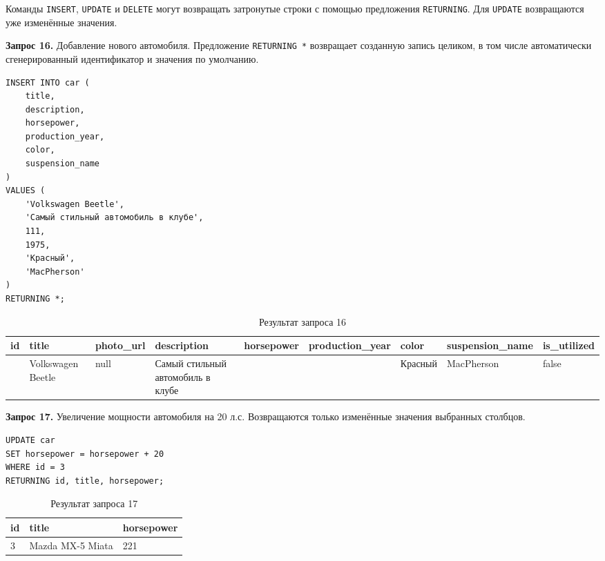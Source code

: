 \documentclass[oneside,a4paper,14pt]{extarticle}
\begin{document}
Команды \texttt{INSERT}, \texttt{UPDATE} и \texttt{DELETE} могут возвращать затронутые строки с помощью предложения \texttt{RETURNING}. Для \texttt{UPDATE} возвращаются уже изменённые значения.

\textbf{Запрос 16.} Добавление нового автомобиля. Предложение \texttt{RETURNING *} возвращает созданную запись целиком, в том числе автоматически сгенерированный идентификатор и значения по умолчанию.

\begin{verbatim}
INSERT INTO car (
    title,
    description,
    horsepower,
    production_year,
    color,
    suspension_name
)
VALUES (
    'Volkswagen Beetle',
    'Самый стильный автомобиль в клубе',
    111,
    1975,
    'Красный',
    'MacPherson'
)
RETURNING *;
\end{verbatim}

\begin{table}[H]
\centering
\scriptsize
\setlength{\tabcolsep}{2pt}
\caption{Результат запроса 16}\label{tab:ret1}
\begin{tabular}{|>{\raggedright\arraybackslash}p{5mm}|>{\raggedright\arraybackslash}p{16mm}|>{\raggedright\arraybackslash}p{21mm}|>{\raggedright\arraybackslash}p{26mm}|>{\raggedright\arraybackslash}p{19mm}|>{\raggedright\arraybackslash}p{19mm}|>{\raggedright\arraybackslash}p{16mm}|>{\raggedright\arraybackslash}p{19mm}|>{\raggedright\arraybackslash}p{14mm}|}
\hline
\textbf{id} & \textbf{title} & \textbf{photo\_\allowbreak url} & \textbf{description} & \textbf{horsepower} & \textbf{production\_\allowbreak year} & \textbf{color} & \textbf{suspension\_\allowbreak name} & \textbf{is\_\allowbreak utilized} \\ \hline
15 & Volkswagen Beetle & null & Самый стильный автомобиль в клубе & 111 & 1975 & Красный & MacPherson & false \\ \hline
\end{tabular}
\end{table}


\textbf{Запрос 17.} Увеличение мощности автомобиля на 20 л.с. Возвращаются только изменённые значения выбранных столбцов.

\begin{verbatim}
UPDATE car
SET horsepower = horsepower + 20
WHERE id = 3
RETURNING id, title, horsepower;
\end{verbatim}

\begin{table}[H]
\centering
\footnotesize

\caption{Результат запроса 17}\label{tab:ret2}
\begin{tabular}{|l|l|l|}
\hline
\textbf{id} & \textbf{title} & \textbf{horsepower} \\ \hline
3 & Mazda MX-5 Miata & 221 \\ \hline
\end{tabular}
\end{table}
\end{document}
